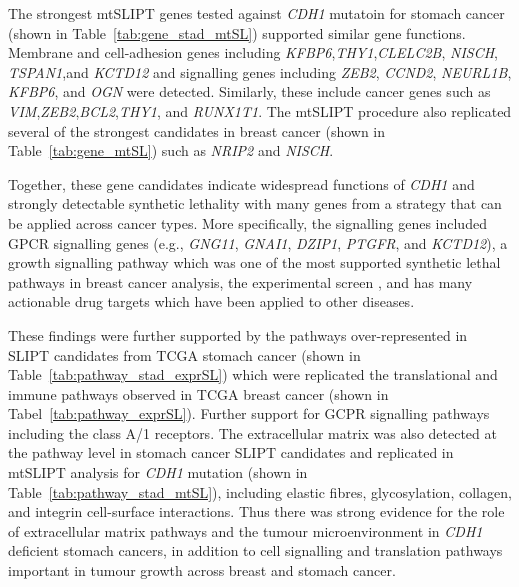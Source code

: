 The strongest mtSLIPT genes tested against \textit{CDH1} mutatoin for stomach cancer (shown in Table~\ref{tab:gene_stad_mtSL}) supported similar gene functions. Membrane and cell-adhesion genes including \textit{KFBP6},\textit{THY1},\textit{CLELC2B}, \textit{NISCH}, \textit{TSPAN1},and \textit{KCTD12} and signalling genes including \textit{ZEB2}, \textit{CCND2}, \textit{NEURL1B}, \textit{KFBP6}, and \textit{OGN} were detected. Similarly, these include cancer genes such as \textit{VIM},\textit{ZEB2},\textit{BCL2},\textit{THY1}, and \textit{RUNX1T1}. The mtSLIPT procedure also replicated several of the strongest candidates in breast cancer (shown in Table~\ref{tab:gene_mtSL}) such as \textit{NRIP2} and \textit{NISCH}.

Together, these gene candidates indicate widespread functions of \textit{CDH1} and strongly detectable synthetic lethality with many genes from a strategy that can be applied across cancer types. More specifically, the signalling genes included GPCR signalling genes (e.g., \textit{GNG11}, \textit{GNAI1}, \textit{DZIP1}, \textit{PTGFR}, and \textit{KCTD12}), a growth signalling pathway which was one of the most supported synthetic lethal pathways in breast cancer analysis, the experimental screen \citep{Telford2015}, and has many actionable drug targets which have been applied to other diseases.

These findings were further supported by the pathways over-represented in \gls{SLIPT} candidates from TCGA stomach cancer (shown in Table~\ref{tab:pathway_stad_exprSL}) which were replicated the translational and immune pathways observed in TCGA breast cancer (shown in Tabel~\ref{tab:pathway_exprSL}). Further support for GCPR signalling pathways including the class A/1 receptors. The extracellular matrix was also detected at the pathway level in stomach cancer \gls{SLIPT} candidates and replicated in mtSLIPT analysis for \textit{CDH1} mutation (shown in Table~\ref{tab:pathway_stad_mtSL}), including elastic fibres, glycosylation, collagen, and integrin cell-surface interactions. Thus there was strong evidence for the role of extracellular matrix pathways and the tumour microenvironment in \textit{CDH1} deficient stomach cancers, in addition to cell signalling and translation pathways important in tumour growth across breast and stomach cancer.



